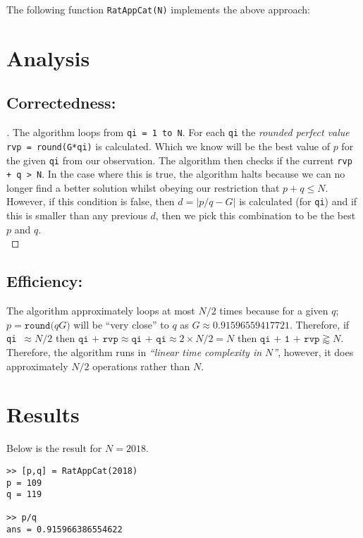 \documentclass[11pt]{report}
\begin{document}
The following function \texttt{RatAppCat(N)} implements the above approach:


\section{Analysis}
\subsection{Correctedness:}
\begin{proof}[\unskip\nopunct]
The algorithm loops from \texttt{qi = 1 to N}. For each \texttt{qi} the \textit{rounded perfect value} \texttt{rvp = round(G*qi)} is calculated. Which we know will be the best value of $p$ for the given \texttt{qi} from our observation. The algorithm then checks if the current \texttt{rvp + q > N}. In the case where this is true, the algorithm halts because we can no longer find a better solution whilst obeying our restriction that $p+q\leq N$. \\

However, if this condition is false, then $d=|p/q - G|$ is calculated (for \texttt{qi}) and if this is smaller than any previous $d$, then we pick this combination to be the best $p$ and $q$. \\
\end{proof}

\subsection{Efficiency:}
The algorithm approximately loops at most $N/2$ times because for a given $q$; $p = \texttt{round(}qG\texttt{)}$ will be ``very close'' to $q$ as $G\approx 0.91596559417721$. Therefore, if \texttt{qi $\approx N/2$} then $\texttt{qi + rvp} \approx \texttt{qi + qi} \approx 2\times N/2 = N$ then $\texttt{qi + 1 + rvp} \gtrapprox N$. \\

Therefore, the algorithm runs in \textit{``linear time complexity in $N$''}, however, it does approximately $N/2$ operations rather than $N$. 

\section{Results} 
Below is the result for $N=2018$. \\

\begin{lstlisting}[title={N=2018}]
>> [p,q] = RatAppCat(2018)
p = 109
q = 119

>> p/q 
ans = 0.915966386554622
\end{lstlisting}
\end{document}

